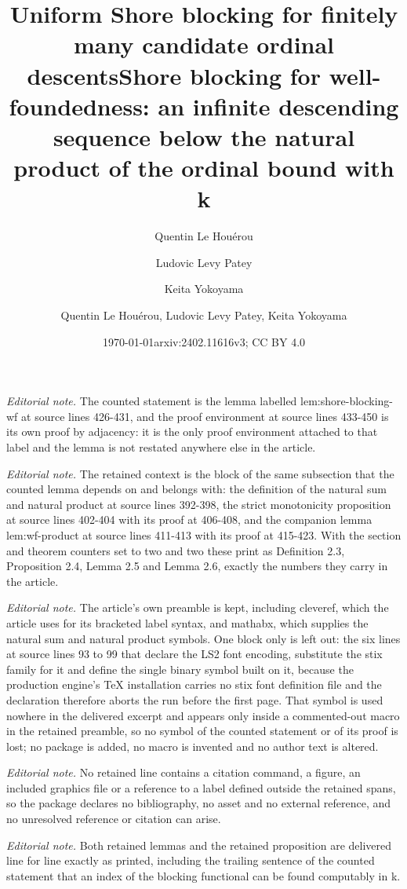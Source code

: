 \documentclass{article}
\author{Quentin Le Hou\'erou \and Ludovic Levy Patey \and Keita Yokoyama}
\title{Uniform Shore blocking for finitely many candidate ordinal descents}
\date{\today}
\title{Shore blocking for well-foundedness: an infinite descending sequence below the natural product of the ordinal bound with k}
\author{Quentin Le Houérou, Ludovic Levy Patey, Keita Yokoyama}
\date{arxiv:2402.11616v3; CC BY 4.0}
\numberwithin{theorem}{section}
\begin{document}
\maketitle
\setcounter{section}{2}
\setcounter{theorem}{2}
\noindent\textit{Editorial note.} The counted statement is the lemma labelled lem:shore-blocking-wf at source lines 426-431, and the proof environment at source lines 433-450 is its own proof by adjacency: it is the only proof environment attached to that label and the lemma is not restated anywhere else in the article.\par\medskip
\noindent\textit{Editorial note.} The retained context is the block of the same subsection that the counted lemma depends on and belongs with: the definition of the natural sum and natural product at source lines 392-398, the strict monotonicity proposition at source lines 402-404 with its proof at 406-408, and the companion lemma lem:wf-product at source lines 411-413 with its proof at 415-423. With the section and theorem counters set to two and two these print as Definition 2.3, Proposition 2.4, Lemma 2.5 and Lemma 2.6, exactly the numbers they carry in the article.\par\medskip
\noindent\textit{Editorial note.} The article's own preamble is kept, including cleveref, which the article uses for its bracketed label syntax, and mathabx, which supplies the natural sum and natural product symbols. One block only is left out: the six lines at source lines 93 to 99 that declare the LS2 font encoding, substitute the stix family for it and define the single binary symbol built on it, because the production engine's TeX installation carries no stix font definition file and the declaration therefore aborts the run before the first page. That symbol is used nowhere in the delivered excerpt and appears only inside a commented-out macro in the retained preamble, so no symbol of the counted statement or of its proof is lost; no package is added, no macro is invented and no author text is altered.\par\medskip
\noindent\textit{Editorial note.} No retained line contains a citation command, a figure, an included graphics file or a reference to a label defined outside the retained spans, so the package declares no bibliography, no asset and no external reference, and no unresolved reference or citation can arise.\par\medskip
\noindent\textit{Editorial note.} Both retained lemmas and the retained proposition are delivered line for line exactly as printed, including the trailing sentence of the counted statement that an index of the blocking functional can be found computably in k.\par\medskip
\end{document}

